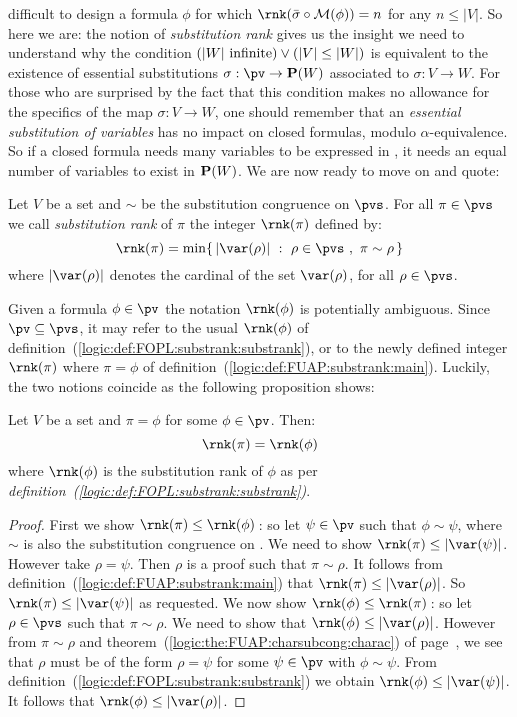 difficult to design a formula $\phi$ for which
$\rnk(\bar{\sigma}\circ{\cal M}(\phi))=n$ for any $n\leq |V|$. So
here we are: the notion of {\em substitution rank} gives us the
insight we need to understand why the condition $(|W|\mbox{\
infinite})\lor(|V|\leq|W|)$ is equivalent to the existence of
essential substitutions $\sigma:\pv\to{\bf P}(W)$ associated to
$\sigma:V\to W$. For those who are surprised by the fact that this
condition makes no allowance for the specifics of the map
$\sigma:V\to W$, one should remember that an {\em essential
substitution of variables} has no impact on closed formulas, modulo
$\alpha$-equivalence. So if a closed formula needs many variables to
be expressed in \pv, it needs an equal number of variables to exist
in ${\bf P}(W)$. We are now ready to move on and quote:

\begin{defin}\label{logic:def:FUAP:substrank:main}
Let $V$ be a set and $\sim$ be the substitution congruence on
$\pvs$. For all $\pi\in\pvs$ we call {\em substitution rank} of
$\pi$ the integer $\rnk(\pi)$ defined by:
    \[
    \rnk(\pi)=\min\{\,|\var(\rho)|\ :\
    \rho\in\pvs\ ,\ \pi\sim\rho\,\}
    \]
where $|\var(\rho)|$ denotes the cardinal of the set $\var(\rho)$,
for all $\rho\in\pvs$.
\end{defin}

Given a formula $\phi\in\pv$ the notation $\rnk(\phi)$ is
potentially ambiguous. Since $\pv\subseteq\pvs$, it may refer to the
usual $\rnk(\phi)$ of
definition~(\ref{logic:def:FOPL:substrank:substrank}), or to the
newly defined integer $\rnk(\pi)$ where $\pi=\phi$ of
definition~(\ref{logic:def:FUAP:substrank:main}). Luckily, the two
notions coincide as the following proposition shows:


\begin{prop}\label{logic:prop:FUAP:substrank:recursion:formula}
Let $V$ be a set and $\pi=\phi$ for some $\phi\in\pv$. Then:
    \[
    \rnk(\pi)=\rnk(\phi)
    \]
where $\rnk(\phi)$ is the substitution rank of $\phi$ as per {\em
definition~(\ref{logic:def:FOPL:substrank:substrank})}.
\end{prop}
\begin{proof}
First we show $\rnk(\pi)\leq\rnk(\phi)$\,: so let $\psi\in\pv$ such
that $\phi\sim\psi$, where $\sim$ is also the substitution
congruence on \pv. We need to show $\rnk(\pi)\leq|\var(\psi)|$.
However take $\rho=\psi$. Then $\rho$ is a proof such that
$\pi\sim\rho$. It follows from
definition~(\ref{logic:def:FUAP:substrank:main}) that
$\rnk(\pi)\leq|\var(\rho)|$. So $\rnk(\pi)\leq|\var(\psi)|$ as
requested. We now show $\rnk(\phi)\leq\rnk(\pi)$\,: so let
$\rho\in\pvs$ such that $\pi\sim\rho$. We need to show that
$\rnk(\phi)\leq|\var(\rho)|$. However from $\pi\sim\rho$ and
theorem~(\ref{logic:the:FUAP:charsubcong:charac}) of
page~\pageref{logic:the:FUAP:charsubcong:charac}, we see that $\rho$
must be of the form $\rho=\psi$ for some $\psi\in\pv$ with
$\phi\sim\psi$. From
definition~(\ref{logic:def:FOPL:substrank:substrank}) we obtain
$\rnk(\phi)\leq|\var(\psi)|$. It follows that
$\rnk(\phi)\leq|\var(\rho)|$.
\end{proof}


